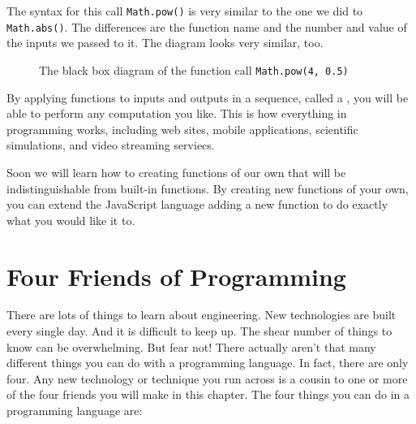 \documentclass{amsart}
\makeatletter
\def\tikzscale{1}\begin{lrbox}{\measure@tikzpicture}%
\edef\tikzscale{\pgfmathresult}%
\makeatother
\begin{document}
The syntax for this call \texttt{Math.pow()} is very similar to the one we did to \texttt{Math.abs()}. The differences are the function name and the number and value of the inputs we passed to it. The diagram looks very similar, too.

\begin{figure}[h]
\begin{scaletikzpicturetowidth}{\textwidth}
\end{scaletikzpicturetowidth}
\caption{The black box diagram of the function call \texttt{Math.pow(4, 0.5)}}
\end{figure}

By applying functions to inputs and outputs in a sequence, called a , you will be able to perform any computation you like. This is how everything in programming works, including web sites, mobile applications, scientific simulations, and video streaming serviecs.

Soon we will learn how to creating functions of our own that will be indistinguishable from built-in functions. By creating new functions of your own, you can extend the JavaScript language adding a new function to do exactly what you would like it to.

\section{Four Friends of Programming}

There are lots of things to learn about engineering. New technologies are built every single day. And it is difficult to keep up. The shear number of things to know can be overwhelming. But fear not! There actually aren't that many different things you can do with a programming language. In fact, there are only four. Any new technology or technique you run across is a cousin to one or more of the four friends you will make in this chapter. The four things you can do in a programming language are:
\end{document}
